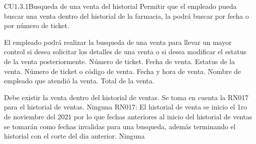 \begin{UseCase} {CU1.3.1}{Busqueda de una venta del historial}{
	Permitir que el empleado pueda buscar una venta dentro del historial de la farmacia, la podrá buscar por fecha o por número de ticket.
}








	
	{
	}
	{
		El empleado podrá realizar la busqueda de una venta para llevar un mayor control si desea solicitar los detalles de una venta o si desea modificar el estatus de la venta posteriormente.
	}
	{
		\UCli Número de ticket.
		\UCli Fecha de venta.
	}
	{
		\UCli Estatus de la venta.
		\UCli Número de ticket o código de venta.
		\UCli Fecha y hora de venta.
		\UCli Nombre de empleado que atendió la venta.
		\UCli Total de la venta.
	}

	{
		\UCli Debe existir la venta dentro del historial de ventas.
		\UCli Se toma en cuenta la RN017 para el historial de ventas.
	}
	{
		Ninguna
	}
	{
		\UCli RN017: El historial de venta se inicio el 1ro de noviembre del 2021 por lo que fechas anteriores al inicio del historial de ventas se tomarán como fechas invalidas para una busqueda, además terminando el historial con el corte del dia anterior.
	}
	{
		Ninguna
	}
\end{UseCase}

